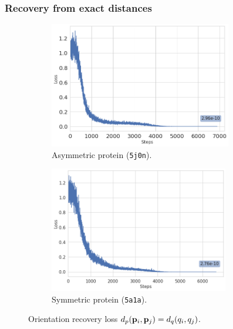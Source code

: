 \subsubsection{Recovery from exact distances}\label{sec:results:orientation-recovery:exact}

\begin{figure}[b]
    \centering
    \begin{subfigure}[b]{0.45\textwidth}
        \includegraphics[height=5.5cm]{images/5j0n_perfect_angle_recovery.png}
        \caption{Asymmetric protein (\texttt{5j0n}).}
    \end{subfigure}
    \hfill
    \begin{subfigure}[b]{0.5\textwidth}
    \centering
        \includegraphics[height=5.5cm]{images/5a1a_perfect_angle_recovery.png}
        \caption{Symmetric protein (\texttt{5a1a}).}
    \end{subfigure}
    \caption{Orientation recovery loss $d_p(\mathbf{p}_i, \mathbf{p}_j) = d_q(q_i, q_j)$. }
    \label{fig:orientation-recovery-loss}
\end{figure}

